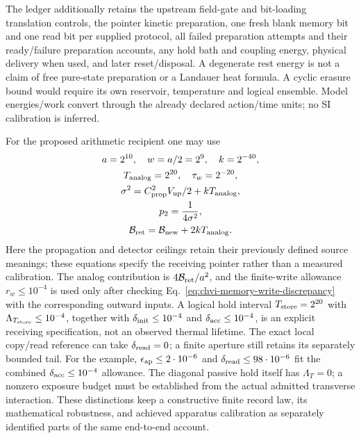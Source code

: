 The ledger additionally retains the upstream field-gate and bit-loading
translation controls, the pointer kinetic preparation, one fresh blank
memory bit and one read bit per supplied protocol, all failed preparation
attempts and their ready/failure
preparation accounts, any hold bath and coupling energy, physical delivery
when used, and later reset/disposal. A degenerate rest energy is not a
claim of free pure-state preparation or a Landauer heat formula. A cyclic
erasure bound would require its own reservoir, temperature and logical
ensemble. Model energies/work convert through the already declared
action/time units; no SI calibration is inferred.

For the proposed arithmetic recipient one may use
\begin{equation}
\begin{gathered}
 a=2^{10},\quad w=a/2=2^9,\quad k=2^{-40},
 \\ T_{\rm analog}=2^{20},\quad\tau_w=2^{-20},\\
 \sigma^2=C_{\rm prop}^2V_{\rm up}/2+kT_{\rm analog},\\
 p_2=\frac1{4\sigma^2},\\
 \mathcal B_{\rm ret}=\mathcal B_{\rm new}+2kT_{\rm analog}.
\end{gathered}
\label{eq:chvi-memory-evaluation-inputs}
\end{equation}
Here the propagation and detector ceilings retain their previously defined
source meanings; these equations specify the receiving pointer rather than
a measured calibration. The analog contribution is
$4\mathcal B_{\rm ret}/a^2$, and the finite-write allowance $r_w\leq10^{-4}$
is used only after checking Eq.~\eqref{eq:chvi-memory-write-discrepancy}
with the corresponding outward inputs.
A logical hold interval $T_{\rm store}=2^{20}$ with
$\Lambda_{T_{\rm store}}\leq10^{-4}$, together with
$\delta_{\rm init}\leq10^{-4}$ and $\delta_{\rm acc}\leq10^{-4}$,
is an explicit receiving specification, not an observed thermal lifetime.
The exact local copy/read reference can take $\delta_{\rm read}=0$;
a finite aperture still retains its separately bounded tail. For the example,
$\epsilon_{\rm ap}\leq2\cdot10^{-6}$ and
$\delta_{\rm read}\leq98\cdot10^{-6}$ fit the combined
$\delta_{\rm acc}\leq10^{-4}$ allowance.
The diagonal passive hold itself has $\Lambda_T=0$; a nonzero exposure
budget must be established from the actual admitted transverse interaction.
These distinctions keep a constructive finite record law, its mathematical
robustness, and achieved apparatus calibration as separately identified
parts of the same end-to-end account.

